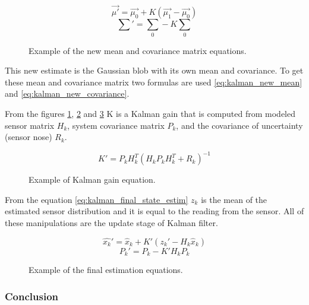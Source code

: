 \documentclass[../../main]{subfiles}
\begin{document}
\begin{figure} [!ht]
  \centering    
    \begin{equation}
       \label{eq:kalman_new_mean}
       \vec{\mu'} = \vec{\mu_0} + K(\vec{\mu_1} - \vec{\mu_0})
    \end{equation}
     \begin{equation}
       \label{eq:kalman_new_covariance}
       \textstyle
       \sum' = \sum_0 - K \sum_0
    \end{equation}
    \label{fig:kalman_new_mean_covariance}
  \caption{Example of the new mean and covariance matrix equations.}
\end{figure}

This new estimate is the Gaussian blob with its own mean and covariance. To get these mean and covariance matrix two formulas are used \ref{eq:kalman_new_mean} and \ref{eq:kalman_new_covariance}.

From the figures \ref{fig:kalman_new_mean_covariance}, \ref{fig:kalman_gain} and \ref{fig:kalman_final_estimation} K is a Kalman gain that is computed from modeled sensor matrix $H_k$, system covariance matrix $P_k$, and the covariance of uncertainty (sensor nose) $R_k$.

\begin{figure} [!ht]
  \centering    
    \begin{equation}
       K' = P_k H_k^T (H_k P_k H_k^T + R_k) ^ {-1}
    \end{equation}
    \label{fig:kalman_gain}
  \caption{Example of Kalman gain equation.}
\end{figure}

From the equation \ref{eq:kalman_final_state_estim} $z_k$ is the mean of the estimated sensor distribution and it is equal to the reading from the sensor.
All of these manipulations are the update stage of Kalman filter.

\begin{figure} [!ht]
  \centering    
    \begin{equation}
       \label{eq:kalman_final_state_estim}
       \hat{x_k}' = \hat{x}_{k} + K' (z_k' - H_k \hat{x}_{k})
    \end{equation}
    \begin{equation}
       P_k' = P_k - K' H_k P_k
    \end{equation}
    \label{fig:kalman_final_estimation}
  \caption{Example of the final estimation equations.}
\end{figure}

\subsubsection*{Conclusion}
\end{document}
